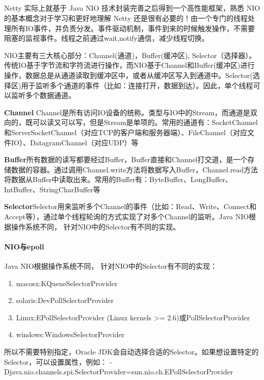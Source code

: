 \documentclass[../../../interview-questions.tex]{subfiles}
\begin{document}
\subsection{\color{red}{Java NIO原理}}

Netty 实际上就基于 Java NIO 技术封装完善之后得到一个高性能框架，熟悉 NIO 的基本概念对于学习和更好地理解 Netty 还是很有必要的！由一个专门的线程处理所有IO事件，并负责分发。事件驱动机制，事件到来的时候触发操作，不需要阻塞的监视事件。线程之前通过wait,notify通信，减少线程切换。

NIO主要有三大核心部分：Channel(通道)，Buffer(缓冲区), Selector（选择器）。传统IO基于字节流和字符流进行操作，而NIO基于Channel和Buffer(缓冲区)进行操作，数据总是从通道读取到缓冲区中，或者从缓冲区写入到通道中。Selector(选择区)用于监听多个通道的事件（比如：连接打开，数据到达）。因此，单个线程可以监听多个数据通道。

\textbf{Channel} Channel是所有访问IO设备的统称。类型与IO中的Stream，而通道是双向的，既可以读又可以写，但是Stream是单项的。常用的通道有：SocketChannel和ServerSocketChannel（对应TCP的客户端和服务器端）、FileChannel（对应文件IO）、DatagramChannel（对应UDP）等

\textbf{Buffer}所有数据的读写都要经过Buffer，Buffer直接和Channel打交道，是一个存储数据的容器。通过调用Channel.write方法将数据写入Buffer，Channel.read方法将数据从Buffer中读取出来。常用的Buffer有：ByteBuffer、LongBuffer、IntBuffer、StringCharBuffer等

\textbf{Selector}Selector用来监听多个Channel的事件（比如：Read、Write、Connect和Accept等），通过单个线程轮询的方式实现了对多个Channel的监听。Java NIO根据操作系统不同， 针对NIO中的Selector有不同的实现。


\paragraph{NIO与epoll}

Java NIO根据操作系统不同， 针对NIO中的Selector有不同的实现：

\begin{enumerate}
\item{macosx:KQueueSelectorProvider}
\item{solaris:DevPollSelectorProvider}
\item{Linux:EPollSelectorProvider (Linux kernels >= 2.6)或PollSelectorProvider}
\item{windows:WindowsSelectorProvider}
\end{enumerate}
所以不需要特别指定，Oracle JDK会自动选择合适的Selector。如果想设置特定的Selector，可以设置属性，例如：
-Djava.nio.channels.spi.SelectorProvider=sun.nio.ch.EPollSelectorProvider
\end{document}

